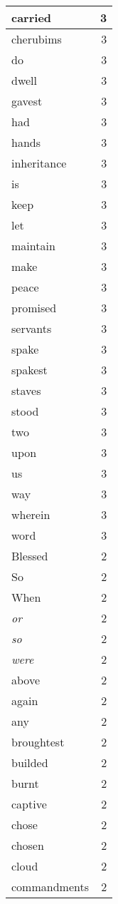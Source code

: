 \begin{center}
\begin{longtable}{l|r}
carried & 3 \\ \hline
cherubims & 3 \\ \hline
do & 3 \\ \hline
dwell & 3 \\ \hline
gavest & 3 \\ \hline
had & 3 \\ \hline
hands & 3 \\ \hline
inheritance & 3 \\ \hline
is & 3 \\ \hline
keep & 3 \\ \hline
let & 3 \\ \hline
maintain & 3 \\ \hline
make & 3 \\ \hline
peace & 3 \\ \hline
promised & 3 \\ \hline
servants & 3 \\ \hline
spake & 3 \\ \hline
spakest & 3 \\ \hline
staves & 3 \\ \hline
stood & 3 \\ \hline
two & 3 \\ \hline
upon & 3 \\ \hline
us & 3 \\ \hline
way & 3 \\ \hline
wherein & 3 \\ \hline
word & 3 \\ \hline
Blessed & 2 \\ \hline
So & 2 \\ \hline
When & 2 \\ \hline
\emph{or} & 2 \\ \hline
\emph{so} & 2 \\ \hline
\emph{were} & 2 \\ \hline
above & 2 \\ \hline
again & 2 \\ \hline
any & 2 \\ \hline
broughtest & 2 \\ \hline
builded & 2 \\ \hline
burnt & 2 \\ \hline
captive & 2 \\ \hline
chose & 2 \\ \hline
chosen & 2 \\ \hline
cloud & 2 \\ \hline
commandments & 2 \\ \hline

\end{longtable}
\end{center}
